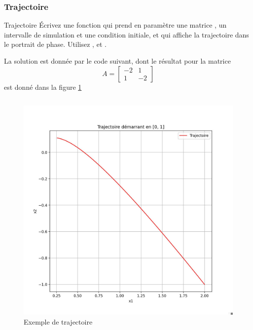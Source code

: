             \subsubsection{Trajectoire}
                \begin{exercise}{Trajectoire}
                    Écrivez une fonction  qui prend en paramètre une matrice , un intervalle de simulation et une condition initiale, et qui affiche la trajectoire dans le portrait de phase. Utilisez ,  et .
                \end{exercise}
                La solution est donnée par le code suivant, dont le résultat pour la matrice
                \begin{equation*}
                    A = \begin{bmatrix}-2 & 1\\ 1 & -2\end{bmatrix}
                \end{equation*}
                est donné dans la figure \ref{fig:trajectoire}
                \inputminted{python}{codes/trajectoire.py}
                \begin{figure}[ht!]
                    \centering
                    \includegraphics[width=\textwidth]{images/trajectoire.jpg}
                    \caption{Exemple de trajectoire}
                    \label{fig:trajectoire}
                \end{figure}
                
